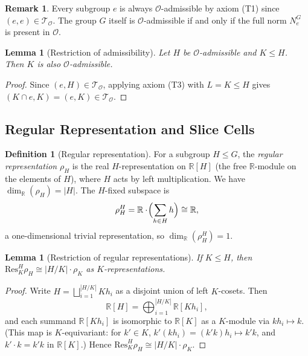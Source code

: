 \documentclass[12pt]{article}
\newtheorem{lemma}[theorem]{Lemma}
\theoremstyle{definition}
\newtheorem{definition}[theorem]{Definition}
\newtheorem{remark}[theorem]{Remark}
\newcommand{\calO}{\mathcal{O}}
\begin{document}
\begin{remark}
Every subgroup $e$ is always $\calO$-admissible by axiom (T1) since $(e,e) \in
\mathcal{T}_\calO$. The group $G$ itself is $\calO$-admissible if and only if the full norm
$N_e^G$ is present in $\calO$.
\end{remark}

\begin{lemma}[Restriction of admissibility]
\label{lem:restriction-admissibility}
Let $H$ be $\calO$-admissible and $K \leq H$. Then $K$ is also $\calO$-admissible.
\end{lemma}

\begin{proof}
Since $(e, H) \in \mathcal{T}_\calO$, applying axiom (T3) with $L = K \leq H$ gives
$(K \cap e, K) = (e, K) \in \mathcal{T}_\calO$.
\end{proof}

\subsection{Regular Representation and Slice Cells}

\begin{definition}[Regular representation]
\label{def:regular-rep}
For a subgroup $H \leq G$, the \emph{regular representation} $\rho_H$ is the real
$H$-representation on $\mathbb{R}[H]$ (the free $\mathbb{R}$-module on the elements of $H$),
where $H$ acts by left multiplication. We have $\dim_\mathbb{R}(\rho_H) = |H|$. The
$H$-fixed subspace is
\[
  \rho_H^H = \mathbb{R}\cdot\!\Bigl(\sum_{h\in H} h\Bigr) \cong \mathbb{R},
\]
a one-dimensional trivial representation, so $\dim_\mathbb{R}(\rho_H^H) = 1$.
\end{definition}

\begin{lemma}[Restriction of regular representations]
\label{lem:restriction-regular}
If $K \leq H$, then $\mathrm{Res}^H_K \rho_H \cong |H/K| \cdot \rho_K$ as $K$-representations.
\end{lemma}

\begin{proof}
Write $H = \bigsqcup_{i=1}^{|H/K|} K h_i$ as a disjoint union of left $K$-cosets. Then
\[
  \mathbb{R}[H] = \bigoplus_{i=1}^{|H/K|} \mathbb{R}[K h_i],
\]
and each summand $\mathbb{R}[K h_i]$ is isomorphic to $\mathbb{R}[K]$ as a $K$-module via
$k h_i \mapsto k$. (This map is $K$-equivariant: for $k' \in K$,
$k'(k h_i) = (k'k) h_i \mapsto k'k$, and $k' \cdot k = k'k$ in $\mathbb{R}[K]$.)
Hence $\mathrm{Res}^H_K \rho_H \cong |H/K| \cdot \rho_K$.
\end{proof}
\end{document}
